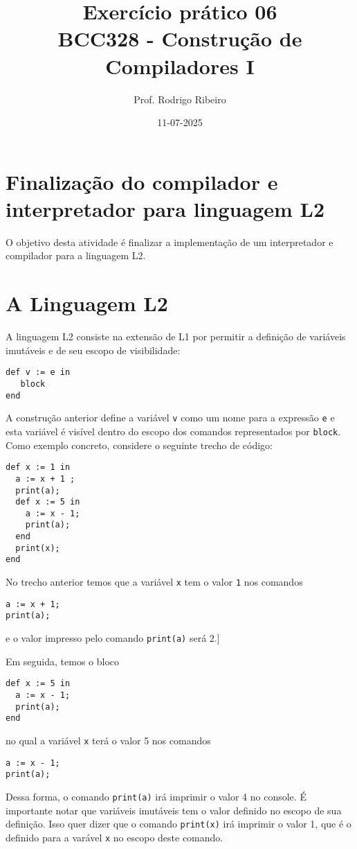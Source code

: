 \documentclass[a4paper,11pt]{article}
\author{Prof. Rodrigo Ribeiro}
\date{11-07-2025}
\title{Exercício prático 06\\\medskip
\large BCC328 - Construção de Compiladores I}
\begin{document}
\maketitle
\section*{Finalização do compilador e interpretador para linguagem L2}
\label{sec:org26bf38b}

O objetivo desta atividade é finalizar a implementação de um interpretador e
compilador para  a linguagem L2.
\section*{A Linguagem L2}
\label{sec:orgddfb2d6}

A linguagem L2 consiste na extensão de L1 por permitir a definição de variáveis imutáveis
e de seu escopo de visibilidade:

\begin{verbatim}
def v := e in
   block
end
\end{verbatim}

A construção anterior define a variável \texttt{v} como um nome para a expressão \texttt{e} e esta variável
é visível dentro do escopo dos comandos representados por \texttt{block}. Como exemplo concreto,
considere o seguinte trecho de código:

\begin{verbatim}
def x := 1 in
  a := x + 1 ;
  print(a);
  def x := 5 in
    a := x - 1;
    print(a);
  end
  print(x);
end
\end{verbatim}

No trecho anterior temos que a variável \texttt{x} tem o valor \texttt{1} nos comandos
\begin{verbatim}
a := x + 1;
print(a);
\end{verbatim}
e o valor impresso pelo comando \texttt{print(a)} será 2.]

Em seguida, temos o bloco

\begin{verbatim}
def x := 5 in
  a := x - 1;
  print(a);
end
\end{verbatim}
no qual a variável \texttt{x} terá o valor 5 nos comandos
\begin{verbatim}
a := x - 1;
print(a);
\end{verbatim}
Dessa forma, o comando \texttt{print(a)} irá imprimir o valor 4 no console.
É importante notar que variáveis imutáveis tem o valor definido no
escopo de sua definição. Isso quer dizer que o comando \texttt{print(x)}
irá imprimir o valor 1, que é o definido para a varável \texttt{x} no escopo
deste comando.
\end{document}
